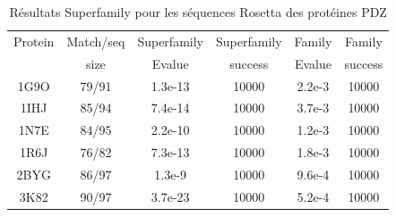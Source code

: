 \begin{table}[h]
  \raggedleft{}

  \begin{tabular}{cccccc}
    
    \toprule
    Protein & Match/seq & Superfamily & Superfamily & Family & Family \\
            & size      & Evalue      & success     & Evalue & success\\
    \cmidrule{1-6}
    1G9O  & 79/91   &    1.3e-13 & 10000 & 2.2e-3 & 10000 \\
    1IHJ  & 85/94   &    7.4e-14 & 10000 & 3.7e-3 & 10000 \\
    1N7E  & 84/95   &    2.2e-10 & 10000 & 1.2e-3 & 10000 \\
    1R6J  & 76/82   &    7.3e-13 & 10000 & 1.8e-3 & 10000 \\
    2BYG  & 86/97   &    1.3e-9  & 10000 & 9.6e-4 & 10000 \\
    3K82  & 90/97   &    3.7e-23 & 10000 & 5.2e-4 & 10000 \\
    \bottomrule        
  \end{tabular}   
  \caption{Résultats Superfamily pour les séquences Rosetta des  protéines PDZ}   
  \label{tab:superfamily_bestRE}       
\end{table}



